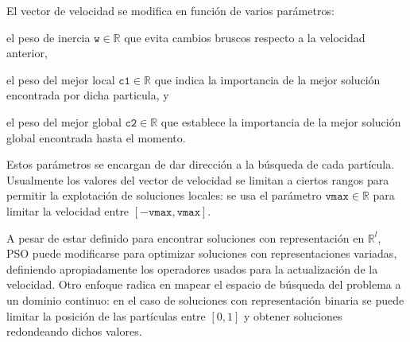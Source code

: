 El vector de velocidad se modifica en función de varios parámetros:
\begin{inparaenum}
\item el peso de inercia $\texttt{w} \in \mathbb{R}$ que evita cambios bruscos respecto a la velocidad anterior,
\item el peso del mejor local $\texttt{c1} \in \mathbb{R}$ que indica la importancia de la mejor solución encontrada por dicha particula, y
\item  el peso del mejor global $\texttt{c2} \in \mathbb{R}$ que establece la importancia de la mejor solución global encontrada hasta el momento.
\end{inparaenum}
Estos parámetros se encargan de dar dirección a la búsqueda de cada partícula. Usualmente los valores del vector de velocidad se limitan a ciertos rangos para permitir la explotación de soluciones locales: se usa el parámetro $\texttt{vmax} \in \mathbb{R}$ para limitar la velocidad entre $[-\texttt{vmax},\texttt{vmax}]$.

A pesar de estar definido para encontrar soluciones con representación en $\mathbb{R}^l$, PSO puede modificarse para optimizar soluciones con representaciones variadas, definiendo apropiadamente los operadores usados para la actualización de la velocidad. Otro enfoque radica en mapear el espacio de búsqueda del problema a un dominio continuo: en el caso de soluciones con representación binaria se puede limitar la posición de las partículas entre $[0,1]$ y obtener soluciones redondeando dichos valores.
